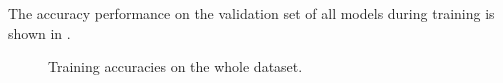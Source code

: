 The accuracy performance on the validation set of all models during training is shown in .
\begin{figure}[!ht]
  \centering
  \caption{Training accuracies on the whole dataset.}
  \label{fig:exp_final_acc}
\end{figure}
\FloatBarrier
\noindent